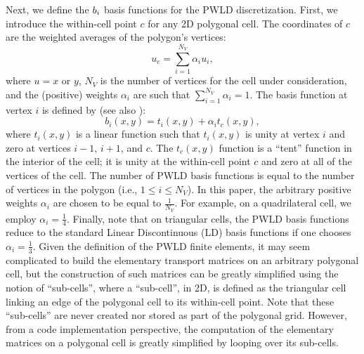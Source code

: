 Next, we define the $b_i$ basis functions for the PWLD discretization. First, we
introduce the within-cell point $c$ for any 2D polygonal cell. The coordinates 
of $c$ are the weighted averages of the polygon's vertices:
\begin{equation}
  u_c = \sum_{i=1}^{N_V} \alpha_i u_i,
\end{equation}
where $u=x$ or $y$, $N_V$ is the number of vertices for the cell under
consideration, and the (positive) weights $\alpha_i$ are such that $\sum_{i=1}^{N_V} \alpha_i =1$. 
The basis function at vertex $i$ is defined by 
(see also \cite{pwld_2d}):
\begin{equation}
  b_i(x,y) = t_i(x,y) + \alpha_i t_c(x,y),
\end{equation}
where $t_i(x,y)$ is a linear function such that $t_i(x,y)$ is unity at vertex
$i$ and zero at vertices $i-1$, $i+1$, and $c$. The $t_c(x,y)$ function is a ``tent''
function in the interior of the cell; it is unity at the within-cell point $c$
and zero at all of the vertices of the cell. The number of PWLD basis functions is 
equal to the number of vertices in the polygon (i.e., $1 \le i \le N_V$). In this paper, the arbitrary
positive weights $\alpha_i$ are chosen to be equal to $\frac{1}{N_V}$. For example, on a
quadrilateral cell, we employ $\alpha_i =\frac{1}{4}$. Finally, note that on
triangular cells, the PWLD basis functions reduce to the
standard Linear Discontinuous (LD) basis functions if one chooses $\alpha_i = \frac{1}{3}$. 
Given the definition of the PWLD
finite elements, it may seem complicated to build the elementary transport 
matrices on an arbitrary polygonal cell, but the construction of such matrices
can be greatly simplified using the notion of ``sub-cells'', where a ``sub-cell'',
in 2D, is defined as the triangular cell linking an edge of the polygonal cell to its
within-cell point. Note that these ``sub-cells'' are never created nor stored as part of the 
polygonal grid. However, from a code implementation perspective, the computation of
the elementary matrices on a polygonal cell is greatly simplified by looping over its sub-cells. 

